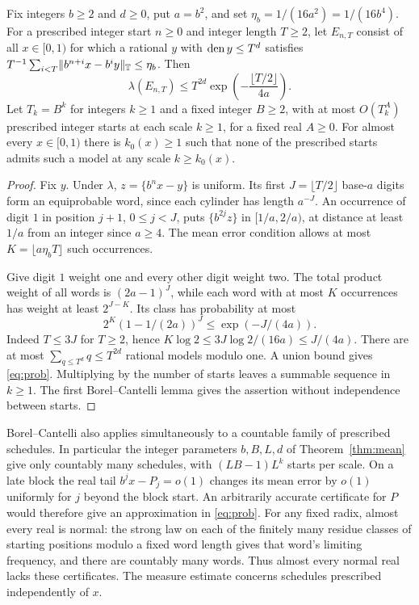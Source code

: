 \documentclass[11pt]{article}
\newcommand{\circabs}[1]{\lVert #1\rVert_{\T}}
\begin{document}
\begin{theorem}\label{thm:count}
Fix integers \(b\ge2\) and \(d\ge0\), put \(a=b^2\), and set \(\eta_b=1/(16a^2)=1/(16b^4)\). For a prescribed integer start \(n\ge0\) and integer length \(T\ge2\), let \(E_{n,T}\) consist of all \(x\in[0,1)\) for which a rational \(y\) with \(\operatorname{den} y\le T^d\) satisfies \(T^{-1}\sum_{i<T}\circabs{b^{n+i}x-b^iy}\le\eta_b\). Then
\begin{equation}\label{eq:prob}
 \lambda(E_{n,T})\le T^{2d}\exp\!\left(-\frac{\lfloor T/2\rfloor}{4a}\right).
\end{equation}
Let \(T_k=B^k\) for integers \(k\ge1\) and a fixed integer \(B\ge2\), with at most \(O(T_k^A)\) prescribed integer starts at each scale \(k\ge1\), for a fixed real \(A\ge0\). For almost every \(x\in[0,1)\) there is \(k_0(x)\ge1\) such that none of the prescribed starts admits such a model at any scale \(k\ge k_0(x)\).
\end{theorem}
\begin{proof}
Fix \(y\). Under \(\lambda\), \(z=\{b^n x-y\}\) is uniform. Its first \(J=\lfloor T/2\rfloor\) base-\(a\) digits form an equiprobable word, since each cylinder has length \(a^{-J}\). An occurrence of digit \(1\) in position \(j+1\), \(0\le j<J\), puts \(\{b^{2j}z\}\) in \([1/a,2/a)\), at distance at least \(1/a\) from an integer since \(a\ge4\). The mean error condition allows at most \(K=\lfloor a\eta_b T\rfloor\) such occurrences.

Give digit \(1\) weight one and every other digit weight two. The total product weight of all words is \((2a-1)^J\), while each word with at most \(K\) occurrences has weight at least \(2^{J-K}\). Its class has probability at most
\[
 2^K(1-1/(2a))^J \le \exp(-J/(4a)).
\]
Indeed \(T\le3J\) for \(T\ge2\), hence \(K\log2\le 3J\log2/(16a)\le J/(4a)\). There are at most \(\sum_{q\le T^d}q\le T^{2d}\) rational models modulo one. A union bound gives \eqref{eq:prob}. Multiplying by the number of starts leaves a summable sequence in \(k\ge1\). The first Borel--Cantelli lemma gives the assertion without independence between starts.
\end{proof}
Borel--Cantelli also applies simultaneously to a countable family of prescribed schedules. In particular the integer parameters \(b,B,L,d\) of Theorem~\ref{thm:mean} give only countably many schedules, with \((LB-1)L^k\) starts per scale. On a late block the real tail \(b^jx-P_j=o(1)\) changes its mean error by \(o(1)\) uniformly for \(j\) beyond the block start. An arbitrarily accurate certificate for \(P\) would therefore give an approximation in \eqref{eq:prob}. For any fixed radix, almost every real is normal: the strong law on each of the finitely many residue classes of starting positions modulo a fixed word length gives that word's limiting frequency, and there are countably many words. Thus almost every normal real lacks these certificates. The measure estimate concerns schedules prescribed independently of \(x\).
\end{document}
